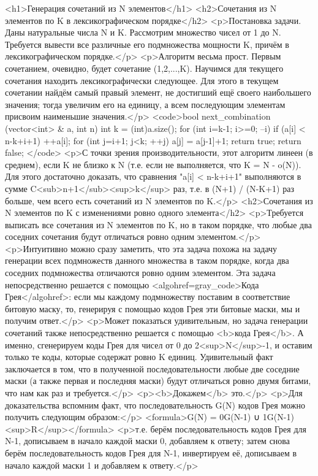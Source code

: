 <h1>Генерация сочетаний из N элементов</h1>
<h2>Сочетания из N элементов по K в лексикографическом порядке</h2>
<p>Постановка задачи. Даны натуральные числа N и K. Рассмотрим множество чисел от 1 до N. Требуется вывести все различные его подмножества мощности K, причём в лексикографическом порядке.</p>
<p>Алгоритм весьма прост. Первым сочетанием, очевидно, будет сочетание (1,2,...,K). Научимся для текущего сочетания находить лексикографически следующее. Для этого в текущем сочетании найдём самый правый элемент, не достигший ещё своего наибольшего значения; тогда увеличим его на единицу, а всем последующим элементам присвоим наименьшие значения.</p>
<code>bool next_combination (vector<int> & a, int n) {
	int k = (int)a.size();
	for (int i=k-1; i>=0; --i)
		if (a[i] < n-k+i+1) {
			++a[i];
			for (int j=i+1; j<k; ++j)
				a[j] = a[j-1]+1;
			return true;
		}
	return false;
}</code>
<p>С точки зрения производительности, этот алгоритм линеен (в среднем), если K не близко к N (т.е. если не выполняется, что K = N - o(N)). Для этого достаточно доказать, что сравнения "a[i] < n-k+i+1" выполняются в сумме C<sub>n+1</sub><sup>k</sup> раз, т.е. в (N+1) / (N-K+1) раз больше, чем всего есть сочетаний из N элементов по K.</p>
<h2>Сочетания из N элементов по K с изменениями ровно одного элемента</h2>
<p>Требуется выписать все сочетания из N элементов по K, но в таком порядке, что любые два соседних сочетания будут отличаться ровно одним элементом.</p>
<p>Интуитивно можно сразу заметить, что эта задача похожа на задачу генерации всех подмножеств данного множества в таком порядке, когда два соседних подмножества отличаются ровно одним элементом. Эта задача непосредственно решается с помощью <algohref=gray_code>Кода Грея</algohref>: если мы каждому подмножеству поставим в соответствие битовую маску, то, генерируя с помощью кодов Грея эти битовые маски, мы и получим ответ.</p>
<p>Может показаться удивительным, но задача генерации сочетаний также непосредственно решается с помощью <b>кода Грея</b>. А именно, сгенерируем коды Грея для чисел от 0 до 2<sup>N</sup>-1, и оставим только те коды, которые содержат ровно K единиц. Удивительный факт заключается в том, что в полученной последовательности любые две соседние маски (а также первая и последняя маски) будут отличаться ровно двумя битами, что нам как раз и требуется.</p>
<p><b>Докажем</b> это.</p>
<p>Для доказательства вспомним факт, что последовательность G(N) кодов Грея можно получить следующим образом:</p>
<formula>G(N) = 0G(N-1) ∪ 1G(N-1)<sup>R</sup></formula>
<p>т.е. берём последовательность кодов Грея для N-1, дописываем в начало каждой маски 0, добавляем к ответу; затем снова берём последовательность кодов Грея для N-1, инвертируем её, дописываем в начало каждой маски 1 и добавляем к ответу.</p>
